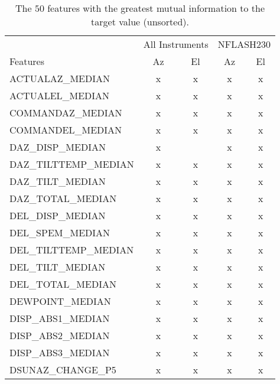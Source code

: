 \begin{table}
    \caption{The $50$ features with the greatest mutual information to the target value (unsorted).}
    \begin{tabular}{lcccc}
        \toprule
        & \multicolumn{2}{c}{All Instruments} & \multicolumn{2}{c}{NFLASH230}\\
        \cmidrule(lr){2-3} \cmidrule(lr){4-5}
        Features & Az & El & Az & El \\  \hline
        ACTUALAZ\_MEDIAN       &      x &      x &      x &      x   \\ \hline
        ACTUALEL\_MEDIAN       &      x &      x &      x &      x   \\ \hline
        COMMANDAZ\_MEDIAN       &      x &      x &      x &      x  \\ \hline
        COMMANDEL\_MEDIAN       &      x &      x &      x &      x  \\ \hline
        DAZ\_DISP\_MEDIAN       &      x &        &      x &      x  \\ \hline
        DAZ\_TILTTEMP\_MEDIAN &      x &      x &      x &      x   \\ \hline
        DAZ\_TILT\_MEDIAN      &      x &      x &      x &      x   \\ \hline
        DAZ\_TOTAL\_MEDIAN      &      x &      x &      x &      x  \\ \hline
        DEL\_DISP\_MEDIAN      &      x &      x &      x &      x   \\ \hline
        DEL\_SPEM\_MEDIAN     &      x &      x &      x &      x   \\ \hline
        DEL\_TILTTEMP\_MEDIAN &      x &      x &      x &      x   \\ \hline
        DEL\_TILT\_MEDIAN     &      x &      x &      x &      x   \\ \hline
        DEL\_TOTAL\_MEDIAN    &      x &      x &      x &      x   \\ \hline
        DEWPOINT\_MEDIAN       &      x &      x &      x &      x   \\ \hline
        DISP\_ABS1\_MEDIAN    &      x &      x &      x &      x  \\ \hline
        DISP\_ABS2\_MEDIAN    &      x &      x &      x &      x  \\ \hline
        DISP\_ABS3\_MEDIAN    &      x &      x &      x &      x  \\ \hline
        DSUNAZ\_CHANGE\_P5    &      x &      x &      x &      x  \\ \hline

\end{tabular}
\end{table}
